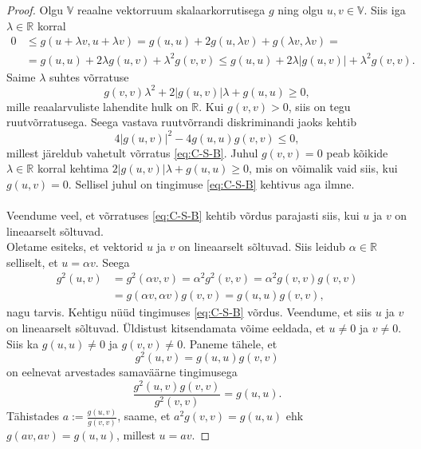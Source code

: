 \documentclass[a4paper,12pt]{article}
\theoremstyle{plain}
\theoremstyle{definition}
\numberwithin{equation}{section}
\def\R{{\mathbb R}}
\begin{document}
\begin{proof}
Olgu $\mathbb{V}$ reaalne vektorruum skalaarkorrutisega $g$ ning olgu $u, v \in \mathbb{V}$. Siis iga $\lambda \in \R$ korral
\begin{align*}
0 &\leq g\left(u+\lambda v,u+\lambda v\right) = g\left(u,u\right) + 2g\left(u, \lambda v \right) + g\left(\lambda v, \lambda v\right) = \\
&= g\left(u,u\right) + 2\lambda g\left(u, v \right) + \lambda^2 g\left(v,v\right) \leq g\left(u,u\right) + 2\lambda | g\left(u, v \right)| + \lambda^2 g\left(v,v\right).
\end{align*}
Saime $\lambda$ suhtes võrratuse
\begin{equation*}
g\left(v,v\right)\lambda^2 + 2|g\left(u, v \right)|\lambda + g\left(u,u\right) \geq 0,
\end{equation*}
mille reaalarvuliste lahendite hulk on $\R$. Kui $g\left(v,v\right) > 0$, siis on tegu ruut\-võrratusega. Seega vastava ruutvõrrandi diskriminandi jaoks kehtib
\begin{equation*}
4|g\left(u,v\right)|^2 - 4g\left(u,u\right)g\left(v,v\right) \leq 0,
\end{equation*}
millest järeldub vahetult võrratus \ref{eq:C-S-B}. Juhul $g\left(v,v\right) = 0$ peab kõikide $\lambda \in \R$ korral kehtima $2|g\left(u,v\right)|\lambda + g\left(u,u\right) \geq 0$, mis on võimalik vaid siis, kui $g\left(u,v\right) = 0$. Sellisel juhul on tingimuse \ref{eq:C-S-B} kehtivus aga ilmne.
\paragraph{}
Veendume veel, et võrratuses \ref{eq:C-S-B} kehtib võrdus parajasti siis, kui $u$ ja $v$ on lineaarselt sõltuvad. \\
Oletame esiteks, et vektorid $u$ ja $v$ on lineaarselt sõltuvad. Siis leidub $\alpha \in \R$ selliselt, et $u = \alpha v$. Seega
\begin{align*}
g^2\left(u,v\right) &= g^2 \left(\alpha v,v\right) = \alpha^2 g^2 \left(v,v\right) = \alpha^2 g \left(v,v\right) g \left(v,v\right) \\
&= g \left(\alpha v,\alpha v\right)g \left( v,v\right) = g \left(u,u\right)g \left(v,v\right),
\end{align*}
nagu tarvis.
\newline
Kehtigu nüüd tingimuses \ref{eq:C-S-B} võrdus. Veendume, et siis $u$ ja $v$ on lineaarselt sõltuvad. Üldistust kitsendamata võime eeldada, et $u \neq 0$ ja $v \neq 0$. Siis ka $g \left(u,u\right) \neq 0$ ja $g \left(v,v\right) \neq 0$. Paneme tähele, et
\[g^2 \left(u, v \right) = g \left(u, u \right) g \left(v, v \right)\]
on eelnevat arvestades samaväärne tingimusega
\[\frac{g^2 \left(u, v \right) g \left(v, v \right)}{g^2 \left(v, v \right) } = g \left(u, u \right). \]
Tähistades $a := \frac{g \left(u, v \right) }{g \left(v, v \right) }$, saame, et $a^2 g \left(v, v \right) = g \left(u, u \right)$ ehk $g \left(av, av \right) = g \left(u, u \right)$, millest $u = av$.
\end{proof}
\end{document}
